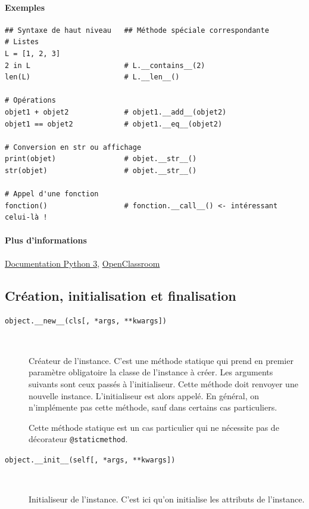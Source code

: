\documentclass[a4paper, 10pt]{article}
\begin{document}
\paragraph{Exemples}
\begin{verbatim}
## Syntaxe de haut niveau   ## Méthode spéciale correspondante
# Listes
L = [1, 2, 3]
2 in L                      # L.__contains__(2)
len(L)                      # L.__len__()

# Opérations
objet1 + objet2             # objet1.__add__(objet2)
objet1 == objet2            # objet1.__eq__(objet2)

# Conversion en str ou affichage
print(objet)                # objet.__str__()
str(objet)                  # objet.__str__()

# Appel d'une fonction
fonction()                  # fonction.__call__() <- intéressant celui-là !
\end{verbatim}

\paragraph{Plus d'informations} \href{https://docs.python.org/3/reference/datamodel.html#specialnames}{Documentation Python 3}, \href{https://openclassrooms.com/courses/apprenez-a-programmer-en-python/les-methodes-speciales-1}{OpenClassroom}


\subsection{Création, initialisation et finalisation}
\begin{description}
    \item[\texttt{object.__new__(cls[, *args, **kwargs])}]~

    Créateur de l'instance. C'est une méthode statique qui prend en premier paramètre obligatoire la classe de l'instance à créer. Les arguments suivants sont ceux passés à l'initialiseur. Cette méthode doit renvoyer une nouvelle instance. L'initialiseur est alors appelé. En général, on n'implémente pas cette méthode, sauf dans certains cas particuliers.\bigskip

    Cette méthode statique est un cas particulier qui ne nécessite pas de décorateur \texttt{@staticmethod}.

    \item[\texttt{object.__init__(self[, *args, **kwargs])}]~

    Initialiseur de l'instance. C'est ici qu'on initialise les attributs de l'instance.
\end{description}
\end{document}
